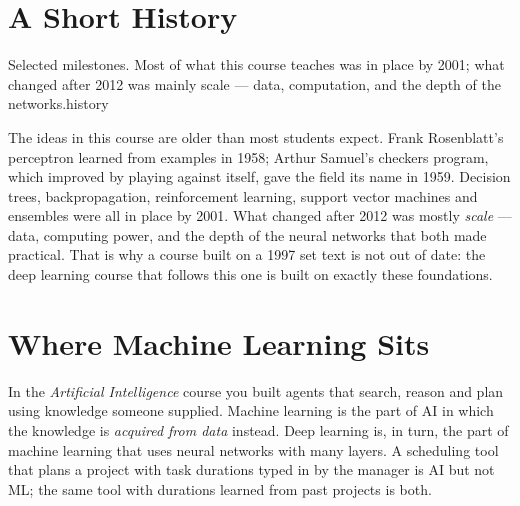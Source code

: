 \section{A Short History}

%
{Selected milestones. Most of what this course teaches was in place by 2001; what changed
after 2012 was mainly scale --- data, computation, and the depth of the networks.}{history}

The ideas in this course are older than most students expect. Frank Rosenblatt's
perceptron learned from examples in 1958; Arthur Samuel's checkers program, which
improved by playing against itself, gave the field its name in 1959. Decision
trees, backpropagation, reinforcement learning, support vector machines and
ensembles were all in place by 2001. What changed after 2012 was mostly
\emph{scale} --- data, computing power, and the depth of the neural networks
that both made practical. That is why a course built on a 1997 set text is not
out of date: the deep learning course that follows this one is built on exactly
these foundations.

\section{Where Machine Learning Sits}

In the \emph{Artificial Intelligence} course you built agents that search,
reason and plan using knowledge someone supplied. Machine learning is the part
of AI in which the knowledge is \emph{acquired from data} instead. Deep learning
is, in turn, the part of machine learning that uses neural networks with many
layers. A scheduling tool that plans a project with task durations typed in by
the manager is AI but not ML; the same tool with durations learned from past
projects is both.

